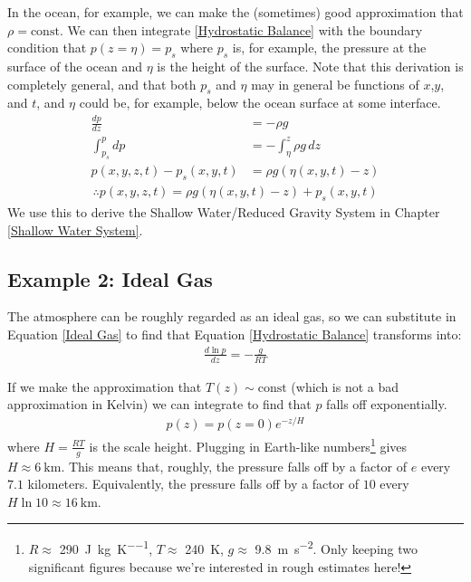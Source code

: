 In the ocean, for example, we can make the (sometimes) good approximation that $\rho=\text{const}$. We can then integrate \ref{Hydrostatic Balance} with the boundary condition that $p(z=\eta)=p_s$ where $p_s$ is, for example, the pressure at the surface of the ocean and $\eta$ is the height of the surface. Note that this derivation is completely general, and that both $p_s$ and $\eta$ may in general be functions of $x$,$y$, and $t$, and $\eta$ could be, for example, below the ocean surface at some interface.
\begin{align*}
    \frac{d p}{d z}&=-\rho g\\
    \int_{p_s}^{p}dp&=-\int_{\eta}^{z}\rho g \, dz\\
    p(x,y,z,t)-p_s(x,y,t)&=\rho g (\eta(x,y,t)-z)
\end{align*}
\begin{align}
    \therefore \boxed{p(x,y,z,t)=\rho g(\eta(x,y,t)-z)+p_s(x,y,t)}
\end{align}
We use this to derive the Shallow Water/Reduced Gravity System in Chapter \ref{Shallow Water System}.

\subsection{Example 2: Ideal Gas}\label{Example 2: Ideal Gas}

The atmosphere can be roughly regarded as an ideal gas, so we can substitute in Equation \ref{Ideal Gas} to find that Equation \ref{Hydrostatic Balance} transforms into:
\begin{align}
    \label{Hydrostatic Balance Ideal}
    \boxed{\frac{d\ln p}{dz}=-\frac{g}{RT}}
\end{align}

If we make the approximation that $T(z)\sim\text{const}$ (which is not a bad approximation in Kelvin) we can integrate to find that $p$ falls off exponentially.
\begin{align*}
    p(z)=p(z=0)e^{-z/H}
\end{align*}
where $H=\frac{RT}{g}$ is the scale height. Plugging in Earth-like numbers\footnote{
    $R\approx$ \qty{290}{\joule\per\kilogram\per\kelvin}, $T\approx$ \qty{240}{\kelvin}, $g\approx$ \qty{9.8}{\meter\per\square\second}. Only keeping two significant figures because we're interested in rough estimates here!
} gives $H\approx\qty{6}{\kilo\meter}$. This means that, roughly, the pressure falls off by a factor of $e$ every $7.1$ kilometers. Equivalently, the pressure falls off by a factor of $10$ every $H\ln 10\approx\qty{16}{\kilo\meter}$.

